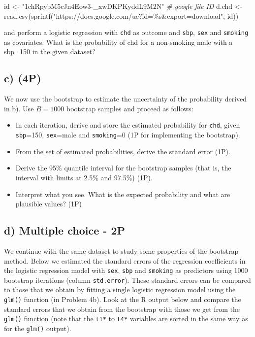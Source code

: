 \documentclass[
]{article}
\newenvironment{Shaded}{\begin{snugshade}}{\end{snugshade}}
\newcommand{\CommentTok}[1]{\textcolor[rgb]{0.56,0.35,0.01}{\textit{#1}}}
\newcommand{\FunctionTok}[1]{\textcolor[rgb]{0.00,0.00,0.00}{#1}}
\newcommand{\NormalTok}[1]{#1}
\newcommand{\OtherTok}[1]{\textcolor[rgb]{0.56,0.35,0.01}{#1}}
\newcommand{\StringTok}[1]{\textcolor[rgb]{0.31,0.60,0.02}{#1}}
\providecommand{\tightlist}{%
  \setlength{\itemsep}{0pt}\setlength{\parskip}{0pt}}
\begin{document}
\begin{Shaded}
\begin{Highlighting}[]
\NormalTok{id }\OtherTok{\textless{}{-}} \StringTok{"1chRpybM5cJn4Eow3{-}\_xwDKPKyddL9M2N"} \CommentTok{\# google file ID}
\NormalTok{d.chd }\OtherTok{\textless{}{-}} \FunctionTok{read.csv}\NormalTok{(}\FunctionTok{sprintf}\NormalTok{(}\StringTok{"https://docs.google.com/uc?id=\%s\&export=download"}\NormalTok{, id))}
\end{Highlighting}
\end{Shaded}

and perform a logistic regression with \texttt{chd} as outcome and
\texttt{sbp}, \texttt{sex} and \texttt{smoking} as covariates. What is
the probability of chd for a non-smoking male with a sbp=150 in the
given dataset?

\hypertarget{c-4p}{%
\subsection{c) (4P)}\label{c-4p}}

We now use the bootstrap to estimate the uncertainty of the probability
derived in b). Use \(B=1000\) bootstrap samples and proceed as follows:

\begin{itemize}
\tightlist
\item
  In each iteration, derive and store the estimated probability for
  \texttt{chd}, given \texttt{sbp}=150, \texttt{sex}=male and
  \texttt{smoking}=0 (1P for implementing the bootstrap).
\item
  From the set of estimated probabilities, derive the standard error
  (1P).
\item
  Derive the 95\% quantile interval for the bootstrap samples (that is,
  the interval with limits at 2.5\% and 97.5\%) (1P).
\item
  Interpret what you see. What is the expected probability and what are
  plausible values? (1P)
\end{itemize}

\hypertarget{d-multiple-choice---2p}{%
\subsection{d) Multiple choice - 2P}\label{d-multiple-choice---2p}}

We continue with the same dataset to study some properties of the
bootstrap method. Below we estimated the standard errors of the
regression coefficients in the logistic regression model with
\texttt{sex}, \texttt{sbp} and \texttt{smoking} as predictors using 1000
bootstrap iterations (column \texttt{std.error}). These standard errors
can be compared to those that we obtain by fitting a single logistic
regression model using the \texttt{glm()} function (in Problem 4b). Look
at the R output below and compare the standard errors that we obtain
from the bootstrap with those we get from the \texttt{glm()} function
(note that the \texttt{t1*} to \texttt{t4*} variables are sorted in the
same way as for the \texttt{glm()} output).
\end{document}
